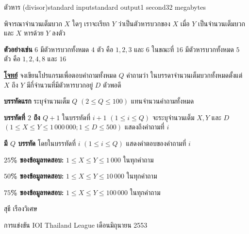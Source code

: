 \documentclass[11pt,a4paper]{article}
\begin{document}
\begin{problem}{ตัวหาร (divisor)}{standard input}{standard output}{1 second}{32 megabytes}

พิจารณาจำนวนเต็มบวก $X$ ใดๆ เราจะเรียก $Y$ ว่าเป็นตัวหารบวกของ $X$ เมื่อ $Y$ เป็นจำนวนเต็มบวก และ $X$ หารด้วย $Y$ ลงตัว

\textbf{ตัวอย่างเช่น} $6$ มีตัวหารบวกทั้งหมด $4$ ตัว คือ $1, 2, 3$ และ $6$ ในขณะที่ $16$ มีตัวหารบวกทั้งหมด $5$ ตัว คือ $1, 2, 4, 8$ และ $16$

\bigskip
\underline{\textbf{โจทย์}}  จงเขียนโปรแกรมเพื่อตอบคำถามทั้งหมด $Q$ คำถามว่า ในบรรดาจำนวนเต็มบวกทั้งหมดตั้งแต่ $X$ ถึง $Y$ มีกี่จำนวนที่มีตัวหารบวกอยู่ $D$ ตัวพอดี


\InputFile

\textbf{บรรทัดแรก} ระบุจำนวนเต็ม $Q$ $(2 \leq Q \leq 100)$ แทนจำนวนคำถามทั้งหมด

\textbf{บรรทัดที่ $2$ ถึง $Q+1$} ในบรรทัดที่ $i+1$ $(1 \leq i \leq Q)$ จะระบุจำนวนเต็ม $X, Y$ และ $D$ $(1 \leq X \leq Y \leq 1\,000\,000; 1 \leq D \leq 500)$ แสดงถึงคำถามที่ $i$


\OutputFile

\textbf{มี $Q$ บรรทัด} โดยในบรรทัดที่ $i$ $(1 \leq i \leq Q)$ แสดงคำตอบของคำถามที่ $i$

\Examples

\begin{example}
%
%
\end{example}

\Scoring

\textbf{$25$\% ของข้อมูลทดสอบ:} $1 \leq X \leq Y \leq1\,000$ ในทุกคำถาม

\textbf{$50$\% ของข้อมูลทดสอบ:} $1 \leq X \leq Y \leq 10\,000$ ในทุกคำถาม

\textbf{$75$\% ของข้อมูลทดสอบ: }$1 \leq X \leq Y \leq 100\,000$ ในทุกคำถาม

\Source

สุธี เรืองวิเศษ

การแข่งขัน IOI Thailand League เดือนมิถุนายน 2553

\end{problem}
\end{document}
